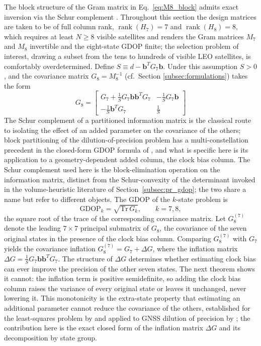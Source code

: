 \documentclass[letterpaper,times]{IONconf-v2}
\theoremstyle{plain}
\theoremstyle{remark}
\begin{document}
The block structure of the Gram matrix in Eq.~\eqref{eq:M8_block} admits exact inversion via the Schur complement \parencite{BarShalom2001}. Throughout this section the design matrices are taken to be of full column rank, $\operatorname{rank}(H_7) = 7$ and $\operatorname{rank}(H_8) = 8$, which requires at least $N \geq 8$ visible satellites and renders the Gram matrices $M_7$ and $M_8$ invertible and the eight-state GDOP finite; the selection problem of interest, drawing a subset from the tens to hundreds of visible LEO satellites, is comfortably overdetermined. Define $S \equiv d - \mathbf{b}^T G_7 \mathbf{b}$. Under this assumption $S > 0$, and the covariance matrix $G_8 = M_8^{-1}$ (cf.~Section \ref{subsec:formulations}) takes the form
%
\begin{equation}\label{eq:G8_schur}
G_8 = \begin{bmatrix} G_7 + \frac{1}{S} G_7 \mathbf{b}\mathbf{b}^T G_7 & -\frac{1}{S} G_7 \mathbf{b} \\[0.5em] -\frac{1}{S} \mathbf{b}^T G_7 & \frac{1}{S} \end{bmatrix}
\end{equation}
%
The Schur complement of a partitioned information matrix is the classical route to isolating the effect of an added parameter on the covariance of the others; block partitioning of the dilution-of-precision problem has a multi-constellation precedent in the closed-form GDOP formula of \textcite{TengWang2016}, and what is specific here is its application to a geometry-dependent added column, the clock bias column. The Schur complement used here is the block-elimination operation on the information matrix, distinct from the Schur-convexity of the determinant invoked in the volume-heuristic literature of Section~\ref{subsec:pr_gdop}; the two share a name but refer to different objects. The GDOP of the $k$-state problem is
%
\begin{equation}\label{eq:gdop_def}
\mathrm{GDOP}_k = \sqrt{\mathrm{Tr}\,G_k}, \qquad k = 7, 8,
\end{equation}
%
the square root of the trace of the corresponding covariance matrix. Let $G_8^{(7)}$ denote the leading $7\times7$ principal submatrix of $G_8$, the covariance of the seven original states in the presence of the clock bias column. Comparing $G_8^{(7)}$ with $G_7$ yields the covariance inflation $G_8^{(7)} = G_7 + \Delta G$, where the inflation matrix $\Delta G = \frac{1}{S} G_7 \mathbf{b}\mathbf{b}^T G_7$. The structure of $\Delta G$ determines whether estimating clock bias can ever improve the precision of the other seven states. The next theorem shows it cannot: the inflation term is positive semidefinite, so adding the clock bias column raises the variance of every original state or leaves it unchanged, never lowering it. This monotonicity is the extra-state property that estimating an additional parameter cannot reduce the covariance of the others, established for the least-squares problem by \textcite{vandiggelen2009agps} and applied to GNSS dilution of precision by \textcite{BlancoDelgado2010}; the contribution here is the exact closed form of the inflation matrix $\Delta G$ and its decomposition by state group.
\end{document}
